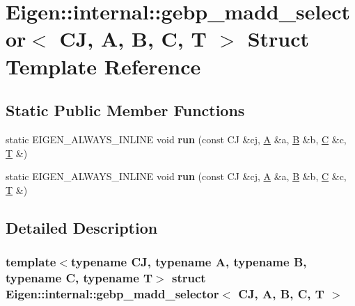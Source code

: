 \hypertarget{struct_eigen_1_1internal_1_1gebp__madd__selector}{}\section{Eigen\+:\+:internal\+:\+:gebp\+\_\+madd\+\_\+selector$<$ CJ, A, B, C, T $>$ Struct Template Reference}
\label{struct_eigen_1_1internal_1_1gebp__madd__selector}
\subsection*{Static Public Member Functions}
\begin{DoxyCompactItemize}
\item 
\mbox{\label{struct_eigen_1_1internal_1_1gebp__madd__selector_ac8ddb995ca21a105b1309c9632b5ca7f}} 
static E\+I\+G\+E\+N\+\_\+\+A\+L\+W\+A\+Y\+S\+\_\+\+I\+N\+L\+I\+NE void {\bfseries run} (const CJ \&cj, \hyperlink{group___core___module_class_eigen_1_1_matrix}{A} \&a, \hyperlink{group___core___module_class_eigen_1_1_matrix}{B} \&b, \hyperlink{group___core___module}{C} \&c, \hyperlink{group___sparse_core___module}{T} \&)
\item 
\mbox{\label{struct_eigen_1_1internal_1_1gebp__madd__selector_ac8ddb995ca21a105b1309c9632b5ca7f}} 
static E\+I\+G\+E\+N\+\_\+\+A\+L\+W\+A\+Y\+S\+\_\+\+I\+N\+L\+I\+NE void {\bfseries run} (const CJ \&cj, \hyperlink{group___core___module_class_eigen_1_1_matrix}{A} \&a, \hyperlink{group___core___module_class_eigen_1_1_matrix}{B} \&b, \hyperlink{group___core___module}{C} \&c, \hyperlink{group___sparse_core___module}{T} \&)
\end{DoxyCompactItemize}


\subsection{Detailed Description}
\subsubsection*{template$<$typename CJ, typename A, typename B, typename C, typename T$>$\newline
struct Eigen\+::internal\+::gebp\+\_\+madd\+\_\+selector$<$ C\+J, A, B, C, T $>$}



